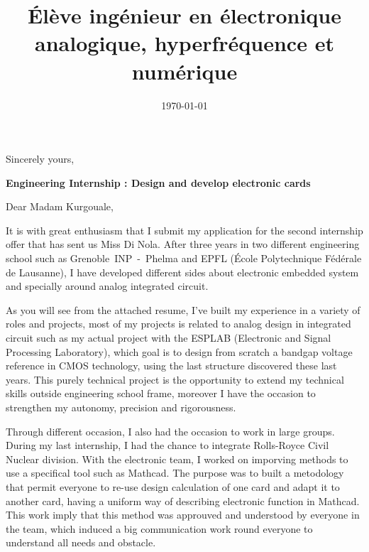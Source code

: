 \documentclass[11pt,a4paper]{moderncv}
\title{Élève ingénieur en électronique analogique, hyperfréquence et numérique}
\begin{document}

\date{\today} %
\opening{} %
\closing{Sincerely yours,} %

\makelettertitle %
\justify

\textbf{Engineering Internship : Design and develop electronic cards }
\newline{}

Dear Madam Kurgouale,\newline{}

It is with great enthusiasm that I submit my application for the second internship offer that has sent us Miss Di Nola.
After three years in two different engineering school such as Grenoble~INP~-~Phelma and EPFL (École Polytechnique Fédérale de Lausanne), I have developed different sides about electronic embedded system and specially around analog integrated circuit.

As you will see from the attached resume, I’ve built my experience in a variety of roles and projects, most of my projects is related to analog design in integrated circuit such as my actual project with the ESPLAB (Electronic and Signal Processing Laboratory), which goal is to design from scratch a bandgap voltage reference in CMOS technology, using the last structure discovered these last years. This purely technical project is the opportunity to extend my technical skills outside engineering school frame, moreover I have the occasion to strengthen my autonomy, precision and rigorousness.

Through different occasion, I also had the occasion to work in large groups. During my last internship, I had the chance to integrate Rolls-Royce Civil Nuclear division.
With the electronic team, I worked on imporving methods to use a specifical tool such as Mathcad. 
The purpose was to built a metodology that permit everyone to re-use design calculation of one card and adapt it to another card, having a uniform way of describing electronic function in Mathcad. 
This work imply that this method was approuved and understood by everyone in the team, which induced a big communication work round everyone to understand all needs and obstacle. 
\end{document}
